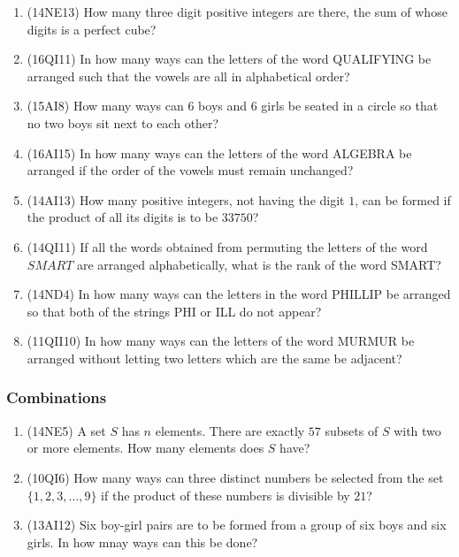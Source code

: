 \documentclass[10pt,paper=letter]{scrartcl}
\begin{document}
\begin{enumerate}

\item (14NE13) How many three digit positive integers are there, the sum of whose digits is a perfect cube?

\item (16QI11) In how many ways can the letters of the word QUALIFYING be arranged such that the vowels are all in alphabetical order?

\item (15AI8) How many ways can $6$ boys and $6$ girls be seated in a circle so that no two boys sit next to each other?

\item (16AI15) In how many ways can the letters of the word ALGEBRA be arranged if the order of the vowels must remain unchanged?

\item (14AI13) How many positive integers, not having the digit $1$, can be formed if the product of all its digits is to be $33750$?

\item (14QI11) If all the words obtained from permuting the letters of the word $SMART$ are arranged alphabetically, what is the rank of the word SMART?

\item (14ND4) In how many ways can the letters in the word PHILLIP be arranged so that both of the strings PHI or ILL do not appear?

\item (11QII10) In how many ways can the letters of the word MURMUR be arranged without letting two letters which are the same be adjacent?

\end{enumerate}

\subsubsection*{Combinations}

\begin{enumerate}

\item (14NE5) A set $S$ has $n$ elements. There are exactly $57$ subsets of $S$ with two or more elements. How many elements does $S$ have?

\item (10QI6) How many ways can three distinct numbers be selected from the set $\{1, 2, 3, \ldots, 9\}$ if the product of these numbers is divisible by $21$?

\item (13AI12) Six boy-girl pairs are to be formed from a group of six boys and six girls. In how mnay ways can this be done?

\end{enumerate}
\end{document}

